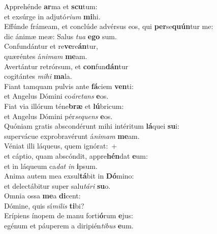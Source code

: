 \evenverse Apprehénde \textbf{ar}ma et \textbf{scu}tum:~\*\\
\evenverse et exsúrge in adjutó\textit{ri}\textit{um} \textbf{mi}hi.\\
\oddverse Effúnde frámeam, et conclúde advérsus eos, qui \textbf{per}se\textbf{quún}tur me:~\*\\
\oddverse dic ánimæ meæ: Salus \textit{tu}\textit{a} \textbf{e}\textbf{go} sum.\\
\evenverse Confundántur et re\textbf{ve}re\textbf{án}tur,~\*\\
\evenverse quæréntes á\textit{ni}\textit{mam} \textbf{me}am.\\
\oddverse Avertántur retrórsum, et \textbf{con}fun\textbf{dán}tur~\*\\
\oddverse cogitántes \textit{mi}\textit{hi} \textbf{ma}la.\\
\evenverse Fiant tamquam pulvis ante \textbf{fá}ciem \textbf{ven}ti:~\*\\
\evenverse et Angelus Dómini co\textit{ár}\textit{ctans} \textbf{e}os.\\
\oddverse Fiat via illórum téne\textbf{bræ} et \textbf{lú}bricum:~\*\\
\oddverse et Angelus Dómini pér\textit{se}\textit{quens} \textbf{e}os.\\
\evenverse Quóniam gratis abscondérunt mihi intéritum \textbf{lá}quei \textbf{su}i:~\*\\
\evenverse supervácue exprobravérunt á\textit{ni}\textit{mam} \textbf{me}am.\\
\oddverse Véniat illi láqueus, quem ignórat:~+\\
\oddverse  et cáptio, quam abscóndit, appre\textbf{hén}dat \textbf{e}um:~\*\\
\oddverse et in láqueum ca\textit{dat} \textit{in} \textbf{i}psum.\\
\evenverse Anima autem mea exsul\textbf{tá}bit in \textbf{Dó}mino:~\*\\
\evenverse et delectábitur super salu\textit{tá}\textit{ri} \textbf{su}o.\\
\oddverse Omnia ossa \textbf{me}a \textbf{di}cent:~\*\\
\oddverse Dómine, quis sí\textit{mi}\textit{lis} \textbf{ti}bi?\\
\evenverse Erípiens ínopem de manu forti\textbf{ó}rum \textbf{e}jus:~\*\\
\evenverse egénum et páuperem a diripién\textit{ti}\textit{bus} \textbf{e}um.\\
